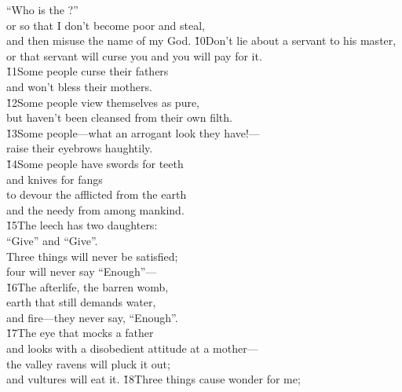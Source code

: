 \begin{poetry}
\poemlll       ``Who is the ?'' \\
\poeml or so that I don't become poor and steal, \\
\poemll    and then misuse the name of my God.
\poeml \v{10}Don't lie about a servant to his master, \\
\poemll    or that servant will curse you and you will pay for it. \\
\poeml \v{11}Some people curse their fathers \\
\poemll    and won't bless their mothers. \\
\poeml \v{12}Some people view themselves as pure, \\
\poemll    but haven't been cleansed from their own filth. \\
\poeml \v{13}Some people---what an arrogant look they have!--- \\
\poemll    raise their eyebrows haughtily. \\
\poeml \v{14}Some people have swords for teeth \\
\poemll    and knives for fangs \\
\poeml to devour the afflicted from the earth \\
\poemll    and the needy from among mankind. \\
\poeml \v{15}The leech has two daughters: \\
\poemll    ``Give'' and ``Give''. \\
\poeml Three things will never be satisfied; \\
\poemll    four will never say ``Enough''--- \\
\poeml \v{16}The afterlife, the barren womb, \\
\poemll    earth that still demands water, \\
\poemlll       and fire---they never say, ``Enough''. \\
\poeml \v{17}The eye that mocks a father \\
\poemll    and looks with a disobedient attitude at a mother--- \\
\poeml the valley ravens will pluck it out; \\
\poemll    and vultures will eat it.
\poeml \v{18}Three things cause wonder for me; \\

\end{poetry}
